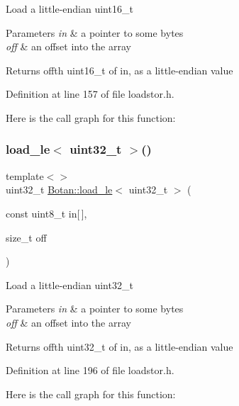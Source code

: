 Load a little-\/endian uint16\+\_\+t 
\begin{DoxyParams}{Parameters}
{\em in} & a pointer to some bytes \\
\hline
{\em off} & an offset into the array \\
\hline
\end{DoxyParams}
\begin{DoxyReturn}{Returns}
off\textquotesingle{}th uint16\+\_\+t of in, as a little-\/endian value 
\end{DoxyReturn}


Definition at line 157 of file loadstor.\+h.

Here is the call graph for this function\+:
\mbox{\label{namespace_botan_a2d9442a9a8c4177d35388d0c82f7f2e0}} 
\subsubsection{\texorpdfstring{load\+\_\+le$<$ uint32\+\_\+t $>$()}{load\_le< uint32\_t >()}}
{\footnotesize\ttfamily template$<$$>$ \\
uint32\+\_\+t \mbox{\hyperlink{namespace_botan_a745efa1d08234fe3b785f17c19ec26b7}{Botan\+::load\+\_\+le}}$<$ uint32\+\_\+t $>$ (\begin{DoxyParamCaption}\item[{const uint8\+\_\+t}]{in\mbox{[}$\,$\mbox{]},  }\item[{size\+\_\+t}]{off }\end{DoxyParamCaption})\hspace{0.3cm}{\ttfamily [inline]}}

Load a little-\/endian uint32\+\_\+t 
\begin{DoxyParams}{Parameters}
{\em in} & a pointer to some bytes \\
\hline
{\em off} & an offset into the array \\
\hline
\end{DoxyParams}
\begin{DoxyReturn}{Returns}
off\textquotesingle{}th uint32\+\_\+t of in, as a little-\/endian value 
\end{DoxyReturn}


Definition at line 196 of file loadstor.\+h.

Here is the call graph for this function\+:
\mbox{\label{namespace_botan_af8e343d945901fa17325279d27a14e39}} 
